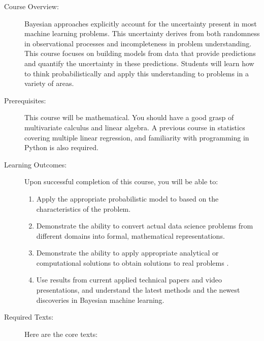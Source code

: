\documentclass[11pt]{article}
\begin{document}
\begin{description}

\item[Course Overview:] 

Bayesian approaches explicitly account for the uncertainty present in most machine learning problems. This uncertainty derives from both randomness in observational processes and incompleteness in problem understanding. This course focuses on building models from data that provide predictions and quantify the uncertainty in these predictions. Students will learn how to think probabilistically and apply this understanding to problems in a variety of areas.

\item[Prerequisites:] This course will be mathematical. You should have a good grasp of multivariate calculus and linear
  algebra. A previous course in statistics covering multiple linear regression, and familiarity with programming in Python is also required.

\item[Learning Outcomes:]  

Upon successful completion of this course, you will be able to:

\begin{enumerate}
\item Apply the appropriate probabilistic model to based on the characteristics of the problem.
\item Demonstrate the ability to convert actual data science problems from different domains into formal, mathematical representations.
\item Demonstrate the ability to apply appropriate analytical or computational solutions to obtain solutions to real problems .
\item Use results from current applied technical papers and video presentations, and understand the latest methods and the newest discoveries in Bayesian machine learning.
\end{enumerate}

\item[Required Texts:]  

Here are the core texts:


\end{description}
\end{document}
